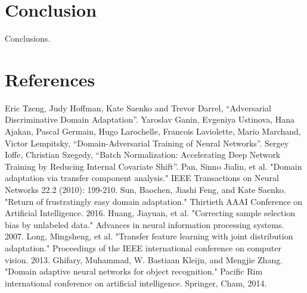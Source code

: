 \documentclass[conference]{IEEEtran}
\begin{document}
\section{Conclusion}
Conclusions.


\section*{References}

\begin{thebibliography}{00}
 Eric Tzeng, Judy Hoffman, Kate Saenko and Trevor Darrel, ``Adversarial Discriminative Domain Adaptation''.
 Yaroslav Ganin, Evgeniya Ustinova, Hana Ajakan, Pascal Germain, Hugo Larochelle, Francois Laviolette,
    Mario Marchand, Victor Lempitsky, ``Domain-Adversarial Training of Neural Networks''.
 Sergey Ioffe, Christian Szegedy, ``Batch Normalization: Accelerating Deep Network Training by Reducing Internal Covariate Shift''.
 Pan, Sinno Jialin, et al. "Domain adaptation via transfer component analysis." IEEE Transactions on Neural Networks 22.2 (2010): 199-210.
 Sun, Baochen, Jiashi Feng, and Kate Saenko. "Return of frustratingly easy domain adaptation." Thirtieth AAAI Conference on Artificial Intelligence. 2016.
 Huang, Jiayuan, et al. "Correcting sample selection bias by unlabeled data." Advances in neural information processing systems. 2007.
 Long, Mingsheng, et al. "Transfer feature learning with joint distribution adaptation." Proceedings of the IEEE international conference on computer vision. 2013. 
 Ghifary, Muhammad, W. Bastiaan Kleijn, and Mengjie Zhang. "Domain adaptive neural networks for object recognition." Pacific Rim international conference on artificial intelligence. Springer, Cham, 2014.  
\end{thebibliography}
\end{document}
